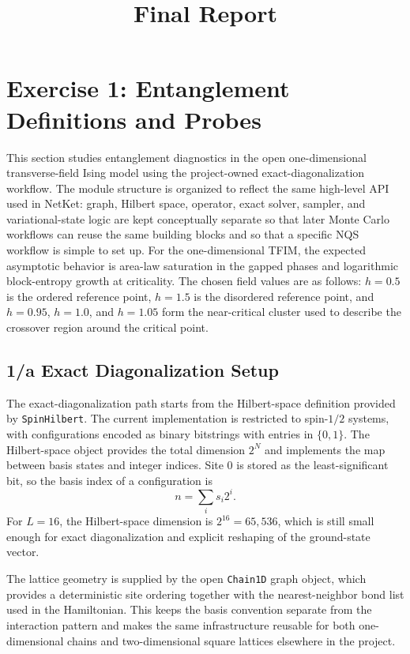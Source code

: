 \documentclass[11pt,a4paper]{article}
\title{Final Report}
\author{}
\date{}
\begin{document}
    \maketitle


    \section*{Exercise 1: Entanglement Definitions and Probes}

    This section studies entanglement diagnostics in the open one-dimensional transverse-field Ising model using the project-owned exact-diagonalization workflow. The module structure is organized to reflect the same high-level API used in NetKet: graph, Hilbert space, operator, exact solver, sampler, and variational-state logic are kept conceptually separate so that later Monte Carlo workflows can reuse the same building blocks and so that a specific NQS workflow is simple to set up. For the one-dimensional TFIM, the expected asymptotic behavior is area-law saturation in the gapped phases and logarithmic block-entropy growth at criticality. The chosen field values are as follows: $h=0.5$ is the ordered reference point, $h=1.5$ is the disordered reference point, and $h=0.95$, $h=1.0$, and $h=1.05$ form the near-critical cluster used to describe the crossover region around the critical point.

    \subsection*{1/a Exact Diagonalization Setup}

    The exact-diagonalization path starts from the Hilbert-space definition provided by \texttt{SpinHilbert}. The current implementation is restricted to spin-$1/2$ systems, with configurations encoded as binary bitstrings with entries in $\{0,1\}$. The Hilbert-space object provides the total dimension $2^N$ and implements the map between basis states and integer indices. Site $0$ is stored as the least-significant bit, so the basis index of a configuration is
    \begin{equation}
        n = \sum_i s_i 2^i .
    \end{equation}
    For $L=16$, the Hilbert-space dimension is $2^{16}=65{,}536$, which is still small enough for exact diagonalization and explicit reshaping of the ground-state vector.

    The lattice geometry is supplied by the open \texttt{Chain1D} graph object, which provides a deterministic site ordering together with the nearest-neighbor bond list used in the Hamiltonian. This keeps the basis convention separate from the interaction pattern and makes the same infrastructure reusable for both one-dimensional chains and two-dimensional square lattices elsewhere in the project.
\end{document}
